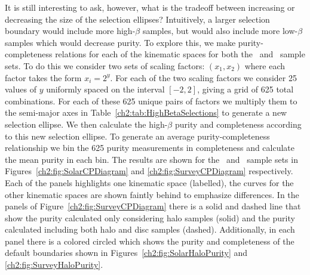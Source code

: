 It is still interesting to ask, however, what is the tradeoff between increasing or decreasing the size of the selection ellipses? Intuitively, a larger selection boundary would include more high-$\beta$ samples, but would also include more low-$\beta$ samples which would decrease purity. To explore this, we make purity-completeness relations for each of the kinematic spaces for both the \solar\ and \survey\ sample sets. To do this we consider two sets of scaling factors: $(x_{1},x_{2})$ where each factor takes the form $x_{i} = 2^{y}$. For each of the two scaling factors we consider 25 values of $y$ uniformly spaced on the interval $[-2,2]$, giving a grid of 625 total combinations. For each of these 625 unique pairs of factors we multiply them to the semi-major axes in Table~\ref{ch2:tab:HighBetaSelections} to generate a new selection ellipse. We then calculate the high-$\beta$ purity and completeness according to this new selection ellipse. To generate an average purity-completeness relationship we bin the 625 purity measurements in completeness and calculate the mean purity in each bin. The results are shown for the \solar\ and \survey\ sample sets in Figures~\ref{ch2:fig:SolarCPDiagram} and \ref{ch2:fig:SurveyCPDiagram} respectively. Each of the panels highlights one kinematic space (labelled), the curves for the other kinematic spaces are shown faintly behind to emphasize differences. In the panels of Figure~\ref{ch2:fig:SurveyCPDiagram} there is a solid and dashed line that show the purity calculated only considering halo samples (solid) and the purity calculated including both halo and disc samples (dashed). Additionally, in each panel there is a colored circled which shows the purity and completeness of the default boundaries shown in Figures~\ref{ch2:fig:SolarHaloPurity} and \ref{ch2:fig:SurveyHaloPurity}.

